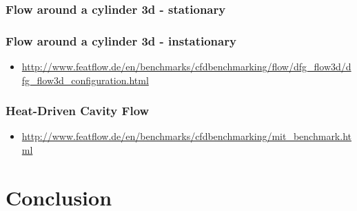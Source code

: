\documentclass[article,type=msc,colorback,accentcolor=tud2a]{tudthesis}
\begin{document}
      \subsubsection{Flow around a cylinder 3d - stationary}
      \subsubsection{Flow around a cylinder 3d - instationary}
        \begin{itemize}
          \item\url{http://www.featflow.de/en/benchmarks/cfdbenchmarking/flow/dfg_flow3d/dfg_flow3d_configuration.html}
        \end{itemize}

      \subsubsection{Heat-Driven Cavity Flow}
        \begin{itemize}
          \item \url{http://www.featflow.de/en/benchmarks/cfdbenchmarking/mit_benchmark.html}
        \end{itemize}
      

  \section{Conclusion}
\end{document}
